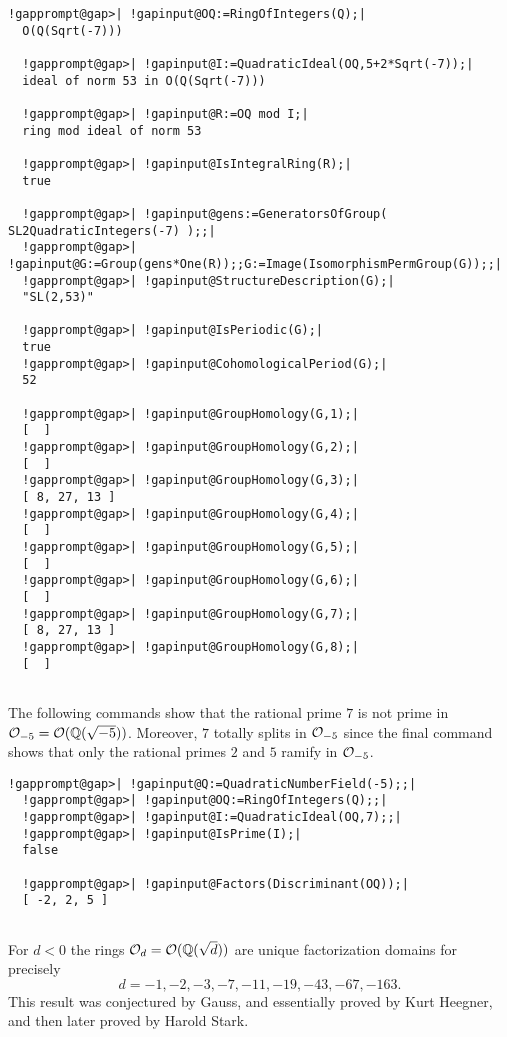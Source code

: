 \documentclass[a4paper,11pt]{report}
\begin{document}
{{\begin{Verbatim}[commandchars=!@|,fontsize=\small,frame=single,label=Example]
  !gapprompt@gap>| !gapinput@OQ:=RingOfIntegers(Q);|
  O(Q(Sqrt(-7)))
  
  !gapprompt@gap>| !gapinput@I:=QuadraticIdeal(OQ,5+2*Sqrt(-7));|
  ideal of norm 53 in O(Q(Sqrt(-7)))
  
  !gapprompt@gap>| !gapinput@R:=OQ mod I;|
  ring mod ideal of norm 53
  
  !gapprompt@gap>| !gapinput@IsIntegralRing(R);|
  true
  
  !gapprompt@gap>| !gapinput@gens:=GeneratorsOfGroup( SL2QuadraticIntegers(-7) );;|
  !gapprompt@gap>| !gapinput@G:=Group(gens*One(R));;G:=Image(IsomorphismPermGroup(G));;|
  !gapprompt@gap>| !gapinput@StructureDescription(G);|
  "SL(2,53)"
  
  !gapprompt@gap>| !gapinput@IsPeriodic(G);|
  true
  !gapprompt@gap>| !gapinput@CohomologicalPeriod(G);|
  52
  
  !gapprompt@gap>| !gapinput@GroupHomology(G,1);|
  [  ]
  !gapprompt@gap>| !gapinput@GroupHomology(G,2);|
  [  ]
  !gapprompt@gap>| !gapinput@GroupHomology(G,3);|
  [ 8, 27, 13 ]
  !gapprompt@gap>| !gapinput@GroupHomology(G,4);|
  [  ]
  !gapprompt@gap>| !gapinput@GroupHomology(G,5);|
  [  ]
  !gapprompt@gap>| !gapinput@GroupHomology(G,6);|
  [  ]
  !gapprompt@gap>| !gapinput@GroupHomology(G,7);|
  [ 8, 27, 13 ]
  !gapprompt@gap>| !gapinput@GroupHomology(G,8);|
  [  ]
  
\end{Verbatim}
 

The following commands show that the rational prime $7$ is not prime in ${\cal O}_{-5}={\cal O}(\mathbb Q(\sqrt{-5}))$. Moreover, $7$ totally splits in ${\cal O}_{-5}$ since the final command shows that only the rational primes $2$ and $5$ ramify in ${\cal O}_{-5}$. 
\begin{Verbatim}[commandchars=!@|,fontsize=\small,frame=single,label=Example]
  !gapprompt@gap>| !gapinput@Q:=QuadraticNumberField(-5);;|
  !gapprompt@gap>| !gapinput@OQ:=RingOfIntegers(Q);;|
  !gapprompt@gap>| !gapinput@I:=QuadraticIdeal(OQ,7);;|
  !gapprompt@gap>| !gapinput@IsPrime(I);|
  false
  
  !gapprompt@gap>| !gapinput@Factors(Discriminant(OQ));|
  [ -2, 2, 5 ]
  
\end{Verbatim}
 

 For $d < 0$ the rings ${\cal O}_d={\cal O}(\mathbb Q(\sqrt{d}))$ are unique factorization domains for precisely 
\[ d = -1, -2, -3, -7, -11, -19, -43, -67, -163.\]
 This result was conjectured by Gauss, and essentially proved by Kurt Heegner,
and then later proved by Harold Stark. 

}}
\end{document}
